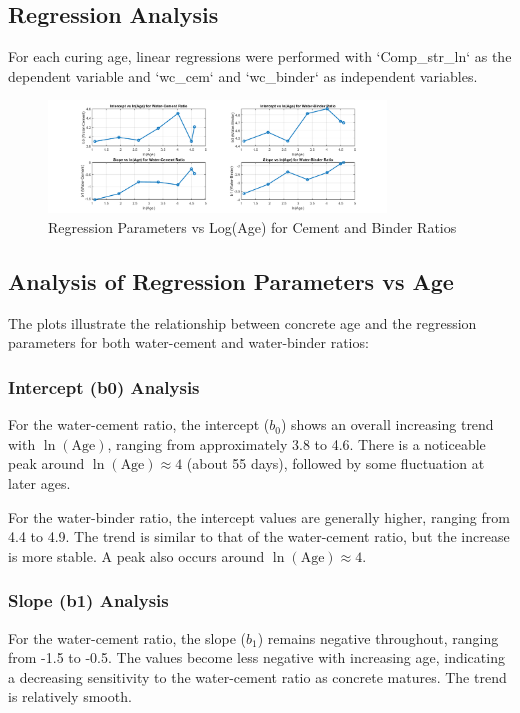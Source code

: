 \documentclass[a4paper,11pt]{article}
\begin{document}
\subsection{Regression Analysis}
For each curing age, linear regressions were performed with `Comp\_str\_ln` as the dependent variable and `wc\_cem` and `wc\_binder` as independent variables.
 
 
\begin{figure}[h]
    \centering
    \includegraphics[width=0.8\textwidth]{step3.png}
    \caption{Regression Parameters vs Log(Age) for Cement and Binder Ratios}
    \label{fig:regression_params}
\end{figure}
 
\subsection*{Analysis of Regression Parameters vs Age}

The plots illustrate the relationship between concrete age and the regression parameters for both water-cement and water-binder ratios:

\subsubsection*{Intercept (b0) Analysis}
For the water-cement ratio, the intercept (\(b_0\)) shows an overall increasing trend with \(\ln(\text{Age})\), ranging from approximately 3.8 to 4.6. There is a noticeable peak around \(\ln(\text{Age}) \approx 4\) (about 55 days), followed by some fluctuation at later ages.

For the water-binder ratio, the intercept values are generally higher, ranging from 4.4 to 4.9. The trend is similar to that of the water-cement ratio, but the increase is more stable. A peak also occurs around \(\ln(\text{Age}) \approx 4\).

\subsubsection*{Slope (b1) Analysis}
For the water-cement ratio, the slope (\(b_1\)) remains negative throughout, ranging from -1.5 to -0.5. The values become less negative with increasing age, indicating a decreasing sensitivity to the water-cement ratio as concrete matures. The trend is relatively smooth.
\end{document}
